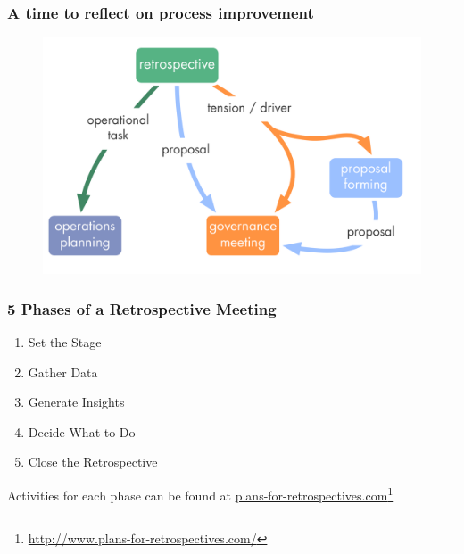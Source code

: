 \subsubsection{A time to reflect on process improvement}
\label{atimetoreflectonprocessimprovement}

\begin{figure}[htbp]
\centering
\includegraphics[keepaspectratio,width=\textwidth,height=0.75\textheight]{img/meetings/retrospective.png}
\end{figure}

\subsubsection{5 Phases of a Retrospective Meeting}
\label{5phasesofaretrospectivemeeting}

\begin{enumerate}
\item Set the Stage

\item Gather Data

\item Generate Insights

\item Decide What to Do

\item Close the Retrospective

\end{enumerate}

Activities for each phase can be found at \href{http://www.plans-for-retrospectives.com/}{plans-for-retrospectives.com}\footnote{\href{http://www.plans-for-retrospectives.com/}{http:/\slash www.plans-for-retrospectives.com\slash }}

